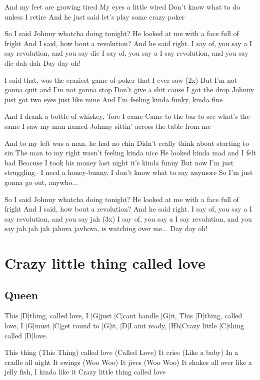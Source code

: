 \documentclass[a4paper,12pt]{article}
\begin{document}
\begin{multicols}{2}
\begin{guitar}
And my feet are growing tired
My eyes a little wired
Don't know what to do unless I retire
And he just said let's play some crazy poker


So I said Johnny whatcha doing tonight?
He looked at me with a face full of fright
And I said, how bout a revolution?
And he said right.
I say of, you say a
I say revolution, and you say die
I say of, you say a
I say revolution, and you say die dah dah
Day day oh!


I said that, was the craziest game of poker 
that I ever saw (2x)
But I'm not gonna quit and I'm not gonna stop
Don't give a shit cause I got the drop
Johnny just got two eyes just like mine
And I'm feeling kinda funky, kinda fine


And I drank a bottle of whiskey, 'fore I came
Came to the bar to see what's the same
I saw my man named Johnny 
sittin' across the table from me


And to my left was a man, he had no chin
Didn't really think about starting to sin
The man to my right wasn't feeling kinda nice
He looked kinda mad and I felt bad
Beacuse I took his money 
last night it's kinda funny
But now I'm just struggling--
I need a honey-bunny.
I don't know what to say anymore
So I'm just gonna go out, anywho...


So I said Johnny whatcha doing tonight?
He looked at me with a face full of fright
And I said, how bout a revolution?
And he said right.
I say of, you say a
I say revolution, and you say jah (3x)
I say of, you say a
I say revolution, and you say jah jah jah jahova
javhova, is watching over me...
Day day oh!  	

\end{guitar}
\section{Crazy little thing called love}
\subsection*{Queen}
\begin{guitar}
This [D]thing, called love, 
I [G]just [C]cant handle [G]it,
This [D]thing, called love, 
I [G]must [C]get round to [G]it,
[D]I aint ready, 
[Hb]Crazy little [C]thing called [D]love.


                   
This thing (This Thing) 
called love (Called Love)
It cries (Like a baby) In a cradle all night
It swings (Woo Woo) It jives (Woo Woo)
It shakes all over like a jelly fish,
I kinda like it
Crazy little thing called love 




\end{guitar}
\end{multicols}
\end{document}
